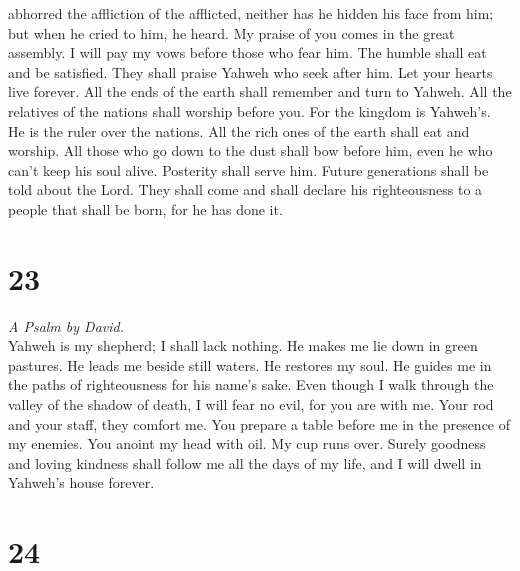 abhorred the affliction of the afflicted, neither has he hidden his face
from him; but when he cried to him, he heard.  My praise
of you comes in the great assembly. I will pay my vows before those who
fear him.  The humble shall eat and be satisfied. They
shall praise Yahweh who seek after him. Let your hearts live forever.
 All the ends of the earth shall remember and turn to
Yahweh. All the relatives of the nations shall worship before you.
 For the kingdom is Yahweh's. He is the ruler over the
nations.  All the rich ones of the earth shall eat and
worship. All those who go down to the dust shall bow before him, even he
who can't keep his soul alive.  Posterity shall serve
him. Future generations shall be told about the Lord. 
They shall come and shall declare his righteousness to a people that
shall be born, for he has done it.

\hypertarget{section-22}{%
\section{23}\label{section-22}}

\emph{A Psalm by David.}\\
 Yahweh is my shepherd; I shall lack nothing.
 He makes me lie down in green pastures. He leads me
beside still waters.  He restores my soul. He guides me in
the paths of righteousness for his name's sake.  Even
though I walk through the valley of the shadow of death, I will fear no
evil, for you are with me. Your rod and your staff, they comfort me.
 You prepare a table before me in the presence of my
enemies. You anoint my head with oil. My cup runs over. 
Surely goodness and loving kindness shall follow me all the days of my
life, and I will dwell in Yahweh's house forever.

\hypertarget{section-23}{%
\section{24}\label{section-23}}

